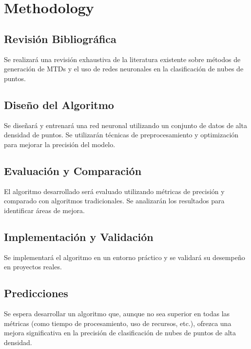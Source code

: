 \section{Methodology}


\subsection{Revisión Bibliográfica}
Se realizará una revisión exhaustiva de la literatura existente sobre métodos de generación de MTDs y el uso de redes neuronales en la clasificación de nubes de puntos.

\subsection{Diseño del Algoritmo}
Se diseñará y entrenará una red neuronal utilizando un conjunto de datos de alta densidad de puntos. Se utilizarán técnicas de preprocesamiento y optimización para mejorar la precisión del modelo.

\subsection{Evaluación y Comparación}
El algoritmo desarrollado será evaluado utilizando métricas de precisión y comparado con algoritmos tradicionales. Se analizarán los resultados para identificar áreas de mejora.

\subsection{Implementación y Validación}
Se implementará el algoritmo en un entorno práctico y se validará su desempeño en proyectos reales.

\subsection{Predicciones}
Se espera desarrollar un algoritmo que, aunque no sea superior en todas las métricas (como tiempo de procesamiento, uso de recursos, etc.), ofrezca una mejora significativa en la precisión de clasificación de nubes de puntos de alta densidad.

